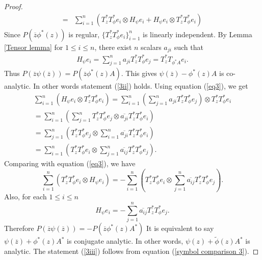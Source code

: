 \documentclass[12pt, reqno]{amsart}
\theoremstyle{definition}
\theoremstyle{remark}
\numberwithin{equation}{section}
\begin{document}
\begin{proof}
\begin{align}
              =&\sum_{i=1}^{n} (T_z^*T^*_\phi e_i \otimes H_\psi e_i + H_\psi e_i \otimes T^*_zT^*_\phi e_i)\label{eq3}
           \end{align}
            Since $P(\overline z \phi^*(z))$ is regular, $\{T^*_zT^*_\phi e_i\}_{i=1}^{n}$ is linearly independent.
            By Lemma \ref{Tensor lemma} for $1\leq i\leq n$, there exist $n$ scalars $a_{ji}$ such that
            \begin{align}
                H_\psi e_i = \sum_{j=1}^{n}a_{ji}T_z^*T^*_\phi e_j
                =T^*_zT_{\phi^* A} e_i.
            \end{align}
            Thus $P(\overline z \psi(\overline z))=P(\overline z \phi^*(z)A).$ This gives $\psi(\overline z)-\phi^*(z)A$ is co-analytic. In other words statement (\ref{3ii}) holds.
            Using equation (\ref{eq3}), we get
            \begin{align*}
            \sum_{i=1}^{n} (H_\psi e_i \otimes T^*_zT^*_\phi e_i)=\sum_{i=1}^{n}(\sum_{j=1}^{n}a_{ji}T_z^*T^*_\phi e_j) \otimes T^*_zT^*_\phi e_i\\
            = \sum_{i=1}^{n}(\sum_{j=1}^{n}T_z^*T^*_\phi e_j \otimes \overline{a_{ji}}T^*_zT^*_\phi e_i)\\
            = \sum_{j=1}^{n}(T_z^*T^*_\phi e_j \otimes \sum_{i=1}^{n}\overline{a_{ji}}T^*_zT^*_\phi e_i)\\
             = \sum_{i=1}^{n}(T_z^*T^*_\phi e_i \otimes \sum_{j=1}^{n}\overline{a_{ij}}T^*_zT^*_\phi e_j).
            \end{align*}
             Comparing with equation (\ref{eq3}), we have
            \begin{equation*}
                \sum_{i=1}^{n} (T_z^*T^*_\phi e_i \otimes H_\psi e_i)=-\sum_{i=1}^{n}(T_z^*T^*_\phi e_i \otimes \sum_{j=1}^{n}\overline{a_{ij}}T^*_zT^*_\phi e_j).
            \end{equation*}
            Also, for each $1\leq i\leq n$
            \begin{equation*}
                 H_\psi e_i=-\sum_{j=1}^{n}\overline{a_{ij}}T^*_zT^*_\phi e_j.
            \end{equation*}
            Therefore $P(\overline z \psi(\overline z))=-P(\overline z \phi^*(z)A^*)$
            It is equivalent to say $\psi(\overline z)+\phi^*(z)A^*$ is conjugate analytic. In other words, $ \psi(z)+\tilde \phi(z)A^*$ is analytic. The statement (\ref{3iii}) follows  from equation (\ref{symbol comparison 3}).
        \end{proof}
\end{document}

